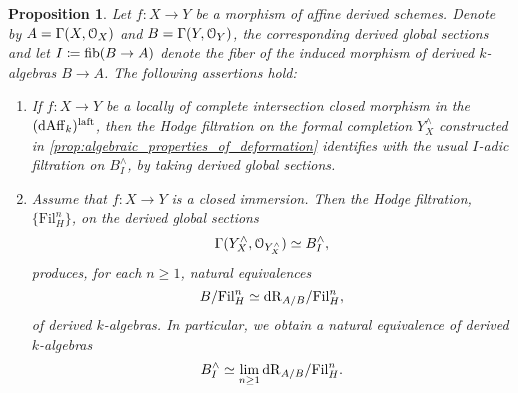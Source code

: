 \documentclass[10pt,a4paper,reqno]{amsart} %
\theoremstyle{plain}
\newtheorem{prop}[thm]{Proposition}
\theoremstyle{definition}
\theoremstyle{remark}
\numberwithin{equation}{section}
\begin{document}

\begin{prop} \label{lem:identification_of_Hodge_and_adic_filtrations}
    Let $f \colon X \to Y$ be a morphism of affine derived schemes. Denote by $A = \Gamma(X, \mathcal O_X)$ and $B = \Gamma(Y, \mathcal O_Y)$, the corresponding derived
    global sections and let $I \coloneqq \mathrm{fib}(B \to A)$ denote the fiber of the induced morphism of derived $k$-algebras $B \to A$. The following assertions hold:
    \begin{enumerate}
        \item If $f \colon X \to Y$ be a locally of complete intersection closed morphism in the \infcat $(\mathrm{dAff}_k)^{\mathrm{laft}}$,
        then the Hodge filtration on the formal completion $Y^\wedge_X$ constructed in
        \cref{prop:algebraic_properties_of_deformation} identifies with the usual $I$-adic filtration on $B^\wedge_I$, by taking derived global sections.
        \item Assume that $f \colon X \to Y$ is a closed immersion. Then the Hodge filtration, $\{ \mathrm{Fil}^n_H \}$,
        on the derived global sections 
            \[\Gamma(Y^\wedge_X,\mathcal O_{Y^\wedge_X}) \simeq B^\wedge_I,\]
        produces, for each $n \ge 1$, natural equivalences
            \[
                B/ \mathrm{Fil}_H^n \simeq \mathrm{dR}_{A/ B}/ \mathrm{Fil}_H^n,
            \]
        of derived $k$-algebras.
        In particular, we obtain a natural equivalence of derived $k$-algebras
            \[
                B^\wedge_I \simeq \lim_{n \ge 1} \mathrm{dR}_{A/ B} / \mathrm{Fil}_H^n.  
            \]
    \end{enumerate}
\end{prop}
\end{document}
